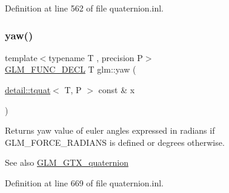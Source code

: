 Definition at line 562 of file quaternion.\+inl.

\mbox{\label{group__gtc__quaternion_ga1de7653ddf380ff06d2300eea831664c}} 
\subsubsection{\texorpdfstring{yaw()}{yaw()}}
{\footnotesize\ttfamily template$<$typename T , precision P$>$ \\
\hyperlink{setup_8hpp_ab2d052de21a70539923e9bcbf6e83a51}{G\+L\+M\+\_\+\+F\+U\+N\+C\+\_\+\+D\+E\+CL} T glm\+::yaw (\begin{DoxyParamCaption}\item[{\hyperlink{structglm_1_1detail_1_1tquat}{detail\+::tquat}$<$ T, P $>$ const \&}]{x }\end{DoxyParamCaption})}

Returns yaw value of euler angles expressed in radians if G\+L\+M\+\_\+\+F\+O\+R\+C\+E\+\_\+\+R\+A\+D\+I\+A\+NS is defined or degrees otherwise.

\begin{DoxySeeAlso}{See also}
\hyperlink{group__gtx__quaternion}{G\+L\+M\+\_\+\+G\+T\+X\+\_\+quaternion} 
\end{DoxySeeAlso}


Definition at line 669 of file quaternion.\+inl.


